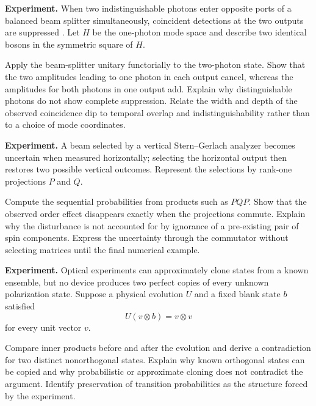 \begin{exercise}
\textbf{Experiment.}
When two indistinguishable photons enter opposite ports of a balanced beam
splitter simultaneously, coincident detections at the two outputs are
suppressed \cite{hong-ou-mandel}.  Let \(H\) be the one-photon mode space and
describe two identical bosons in the symmetric square of \(H\).

Apply the beam-splitter unitary functorially to the two-photon state.  Show
that the two amplitudes leading to one photon in each output cancel, whereas
the amplitudes for both photons in one output add.  Explain why distinguishable
photons do not show complete suppression.  Relate the width and depth of the
observed coincidence dip to temporal overlap and indistinguishability rather
than to a choice of mode coordinates.
\end{exercise}

\begin{exercise}
\textbf{Experiment.}
A beam selected by a vertical Stern--Gerlach analyzer becomes uncertain when
measured horizontally; selecting the horizontal output then restores two
possible vertical outcomes.  Represent the selections by rank-one
projections \(P\) and \(Q\).

Compute the sequential probabilities from products such as \(PQP\).  Show
that the observed order effect disappears exactly when the projections
commute.  Explain why the disturbance is not accounted for by ignorance of a
pre-existing pair of spin components.  Express the uncertainty through the
commutator without selecting matrices until the final numerical example.
\end{exercise}

\begin{exercise}
\textbf{Experiment.}
Optical experiments can approximately clone states from a known ensemble, but
no device produces two perfect copies of every unknown polarization state.
Suppose a physical evolution \(U\) and a fixed blank state \(b\) satisfied
\[
        U(v\otimes b)=v\otimes v
\]
for every unit vector \(v\).

Compare inner products before and after the evolution and derive a
contradiction for two distinct nonorthogonal states.  Explain why known
orthogonal states can be copied and why probabilistic or approximate cloning
does not contradict the argument.  Identify preservation of transition
probabilities as the structure forced by the experiment.
\end{exercise}


